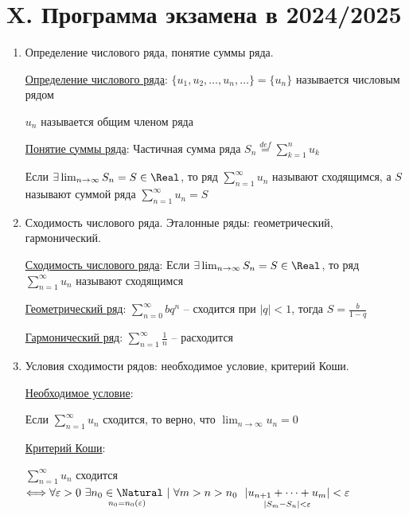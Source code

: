 \clearpage

\section{X. Программа экзамена в 2024/2025}


\begin{enumerate}
\subsection{X.1. Числовые ряды.}

    \item Определение числового ряда, понятие суммы ряда.

    \hyperlink{numberseriesdefinition}{Определение числового ряда}: $\{u_1, u_2, \dots, u_n, \dots\} = \{u_n\}$ называется числовым рядом

    $u_n$ называется общим членом ряда
    
    \hyperlink{sumofseriesdefinition}{Понятие суммы ряда}: Частичная сумма ряда $S_n \stackrel{def}{=} \sum_{k = 1}^{n} u_k$

    Если $\exists \lim_{n \to\infty} S_n = S \in \Real$, то ряд $\sum_{n = 1}^\infty u_n$ называют сходящимся,
    а $S$ называют суммой ряда $\sum_{n = 1}^\infty u_n = S$

    \item Сходимость числового ряда. Эталонные ряды: геометрический, гармонический.

    \hyperlink{seriesconvergence}{Сходимость числового ряда}: Если $\exists \lim_{n \to\infty} S_n = S \in \Real$, то ряд $\sum_{n = 1}^\infty u_n$ называют сходящимся

    \hyperlink{geometricseries}{Геометрический ряд}: $\sum_{n = 0}^\infty b q^n$ -- сходится при $|q| < 1$, тогда $S = \frac{b}{1 - q}$
    
    \hyperlink{harmonicseries}{Гармонический ряд}: $\sum_{n = 1}^\infty \frac{1}{n}$ -- расходится

    \item Условия сходимости рядов: необходимое условие, критерий Коши.

    \hyperlink{necessarycondition}{Необходимое условие}: 

    \Ths Если $\sum_{n = 1}^\infty u_n$ сходится, то верно, что $\lim_{n \to \infty} u_n = 0$

    \hyperlink{cauchycriteria}{Критерий Коши}:

    \Ths $\sum_{n = 1}^\infty u_n$ сходится $\Longleftrightarrow \forall \varepsilon > 0 \ \exists \underset{n_0 = n_0 (\varepsilon)}{n_0 \in \Natural} \ | \ \forall m > n > n_0 \ \ \underset{|S_m - S_n| < \varepsilon}{|u_{n + 1} + \dots + u_m|} < \varepsilon$


\end{enumerate}
